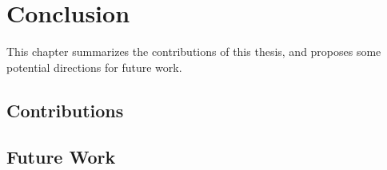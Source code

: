 \chapter{Conclusion}
\label{chap:con}

{
This chapter summarizes the contributions of this thesis, and proposes some potential directions for future work.
}

\section{Contributions}

\section{Future Work}

\chapterend

